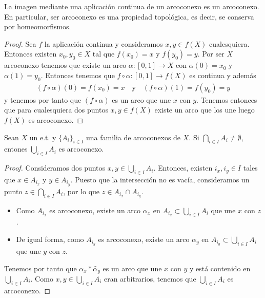 \begin{teo}
    La imagen mediante una aplicación continua de un arcoconexo es un arcoconexo. En particular, ser arcoconexo es una propiedad topológica, es decir, se conserva por homeomorfismos.
    \begin{proof}
        Sea $f$ la aplicación continua y consideramos $x,y\in f(X)$ cualesquiera. Entonces existen $x_0,y_0\in X$ tal que $f(x_0)=x$ y $f(y_0) = y$. Por ser $X$ arcoconexo tenemos que existe un arco $\alpha:[0,1]\to X$ con $\alpha(0)=x_0$ y $\alpha(1)=y_0$. Entonces tenemos que $f\circ \alpha: [0,1]\to f(X)$ es continua y además
        \begin{gather*}
            (f\circ \alpha)(0) = f(x_0) = x \ \ \ \text{ y } \ \ \ (f\circ\alpha)(1) = f(y_0) = y
        \end{gather*}
        y tenemos por tanto que $(f\circ \alpha)$ es un arco que une $x$ con $y$. Tenemos entonces que para cualesquiera dos puntos $x,y\in f(X)$ existe un arco que los une luego $f(X)$ es arcoconexo.
    \end{proof}
\end{teo}

\begin{teo}\label{teo:union_arcoconexos}
    Sean $X$ un e.t. y $\{A_i\}_{i\in I}$ una familia de arcoconexos de $X$. Si $\bigcap\limits_{i\in I}A_i \neq \emptyset$, entones $\bigcup\limits_{i\in I}A_i$ es arcoconexo.
\end{teo}
\begin{proof}
    Consideramos dos puntos $x,y\in \bigcup\limits_{i\in I}A_i$. Entonces, existen $i_x, i_y\in I$ tales que $x\in A_{i_x}$ y $y\in A_{i_y}$. Puesto que la intersección no es vacía, consideramos un punto $z\in \bigcap\limits_{i\in I}A_i$, por lo que $z\in A_{i_x}\cap A_{i_y}$. 
    \begin{itemize}
        \item Como $A_{i_x}$ es arcoconexo, existe un arco $\alpha_x$ en $A_{i_x}\subset \bigcup\limits_{i\in I}A_i$ que une $x$ con $z$.
        \item De igual forma, como $A_{i_y}$ es arcoconexo, existe un arco $\alpha_y$ en $A_{i_y}\subset \bigcup\limits_{i\in I}A_i$ que une $y$ con $z$.
    \end{itemize}
    Tenemos por tanto que $\alpha_x\ast \tilde{\alpha_y}$ es un arco que une $x$ con $y$ y está contenido en $\bigcup\limits_{i\in I}A_i$. Como $x,y\in \bigcup\limits_{i\in I}A_i$ eran arbitrarios, tenemos que $\bigcup\limits_{i\in I}A_i$ es arcoconexo.
\end{proof}

